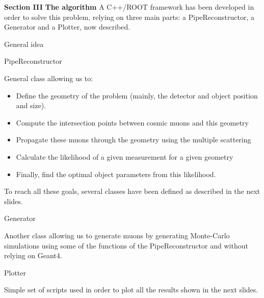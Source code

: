 \documentclass[8 pt]{beamer}
\begin{document}
\begin{frame}{}
\centering
	\huge{\textbf{\color{mycolor} Section III}} \newline
	\LARGE{\textbf{\color{mycolor} The algorithm \color{black}}} \vfill
A C++/ROOT framework has been developed in order to solve this problem, relying on three main parts: a PipeReconstructor, a Generator and a Plotter, now described. \vfill
\end{frame}

\begin{frame}{General idea}
\begin{exampleblock}{} PipeReconstructor \end{exampleblock}
General class allowing us to:
\begin{itemize}
\justifying
\item Define the geometry of the problem (mainly, the detector and object position and size).
\item Compute the intersection points between cosmic muons and this geometry
\item Propagate these muons through the geometry using the multiple scattering
\item Calculate the likelihood of a given measurement for a given geometry
\item Finally, find the optimal object parameters from this likelihood.
\end{itemize}
To reach all these goals, several classes have been defined as described in the next slides. \vfill

\begin{exampleblock}{} Generator \end{exampleblock}
Another class allowing us to generate muons by generating Monte-Carlo simulations using some of the functions of the PipeReconstructor and without relying on Geant4. \vfill

\begin{exampleblock}{} Plotter \end{exampleblock}
Simple set of scripts used in order to plot all the results shown in the next slides. \vfill
\end{frame}
\end{document}
